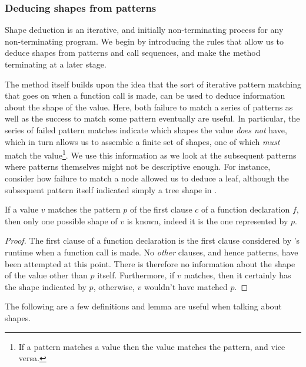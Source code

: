 
\subsubsection{Deducing shapes from patterns}

Shape deduction is an iterative, and initially non-terminating process for any
non-terminating program. We begin by introducing the rules that allow us to
deduce shapes from patterns and call sequences, and make the method terminating
at a later stage.

The method itself builds upon the idea that the sort of iterative pattern
matching that goes on when a function call is made, can be used to deduce
information about the shape of the value. Here, both failure to match a series
of patterns as well as the success to match some pattern eventually are useful.
In particular, the series of failed pattern matches indicate which shapes the
value \emph{does not} have, which in turn allows us to assemble a finite set of
shapes, one of which \emph{must} match the value\footnote{If a pattern matches
a value then the value matches the pattern, and vice versa.}. We use this
information as we look at the subsequent patterns where patterns themselves
might not be descriptive enough. For instance, consider how failure to match a
node allowed us to deduce a leaf, although the subsequent pattern itself
indicated simply a tree shape in .

\begin{lemma}\label{lemma:extend-first-clause} If a value $v$ matches the
pattern $p$ of the first clause $c$ of a function declaration $f$, then only
one possible shape of $v$ is known, indeed it is the one represented by
$p$.\end{lemma}

\begin{proof} The first clause of a function declaration is the first clause
considered by \D{}'s runtime when a function call is made. No \emph{other}
clauses, and hence patterns, have been attempted at this point. There is
therefore no information about the shape of the value other than $p$ itself.
Furthermore, if $v$ matches, then it certainly has the shape indicated by $p$,
otherwise, $v$ wouldn't have matched $p$.\end{proof}

The following are a few definitions and lemma are useful when talking about
shapes.

